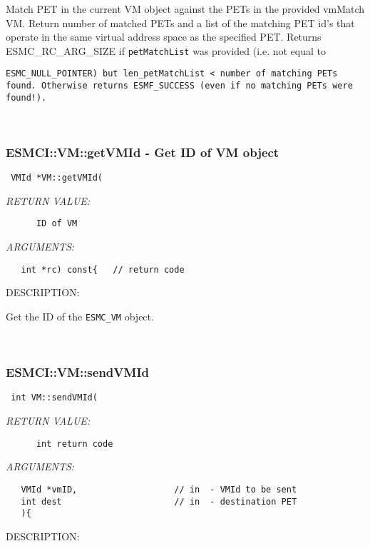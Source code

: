       Match PET in the current VM object against the PETs in the
      provided vmMatch VM. Return number of matched PETs and a list of the
      matching PET id's that operate in the same virtual address space as
      the specified PET.
      Returns ESMC_RC_ARG_SIZE if {\tt petMatchList} was provided
      (i.e. not equal to {\tt ESMC\_NULL\_POINTER) but
      {\tt len_petMatchList} < number of matching PETs found.
      Otherwise returns ESMF_SUCCESS (even if no matching PETs were found!).
   
 
\mbox{}\hrulefill\
 
\subsubsection [ESMCI::VM::getVMId] {ESMCI::VM::getVMId - Get ID of VM object}


  
\begin{verbatim} VMId *VM::getVMId(\end{verbatim}{\em RETURN VALUE:}
\begin{verbatim}      ID of VM\end{verbatim}{\em ARGUMENTS:}
\begin{verbatim}   int *rc) const{   // return code\end{verbatim}
{\sf DESCRIPTION:\\ }


     Get the ID of the {\tt ESMC\_VM} object.
   
 
\mbox{}\hrulefill\
 
\subsubsection [ESMCI::VM::sendVMId] {ESMCI::VM::sendVMId}


  
\begin{verbatim} int VM::sendVMId(\end{verbatim}{\em RETURN VALUE:}
\begin{verbatim}      int return code\end{verbatim}{\em ARGUMENTS:}
\begin{verbatim}   VMId *vmID,                   // in  - VMId to be sent
   int dest                      // in  - destination PET
   ){\end{verbatim}
{\sf DESCRIPTION:\\ }


}
